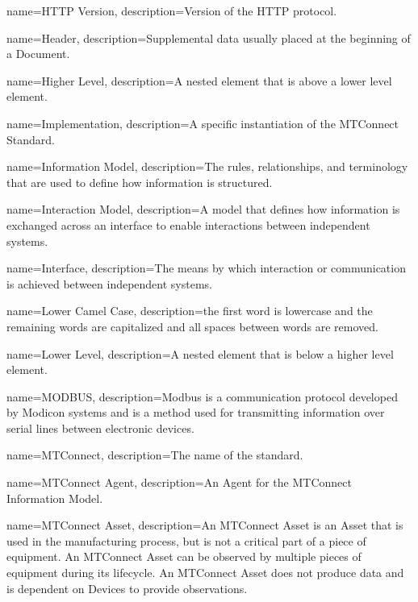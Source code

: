 {
    name={HTTP Version},
	description={Version of the HTTP protocol.}
}

{
    name={Header},
	description={Supplemental data usually placed at the beginning of a \gls{Document}.}
}

{
    name={Higher Level},
	description={A nested element that is above a lower level element.}
}

{
    name={Implementation},
	description={A specific instantiation of the MTConnect Standard.}
}

{
    name={Information Model},
	description={The rules, relationships, and terminology that are used to define how information is structured.}
}

{
    name={Interaction Model},
	description={A model that deﬁnes how information is exchanged across an interface to enable interactions between independent systems.}
}

{
    name={Interface},
	description={The means by which interaction or communication is achieved between independent systems.}
}

{
    name={Lower Camel Case},
	description={the first word is lowercase and the remaining words are capitalized and all spaces between words are removed.}
}

{
    name={Lower Level},
	description={A nested element that is below a higher level element.}
}

{
    name={MODBUS},
	description={Modbus is a communication protocol developed by Modicon systems and is a method used for transmitting information over serial lines between electronic devices.}
}

{
    name={MTConnect},
	description={The name of the standard.}
}

{
    name={MTConnect Agent},
	description={An \gls{Agent} for the \gls{MTConnect Information Model}.}
}

{
    name={MTConnect Asset},
	description={An \gls{MTConnect Asset} is an \gls{Asset} that is used in the manufacturing process, but is not a critical part of a piece of equipment. An \gls{MTConnect Asset} can be observed by multiple pieces of equipment during its lifecycle.
An \gls{MTConnect Asset} does not produce data and is dependent on \glspl{Device} to provide \glspl{observation}.
}
}

